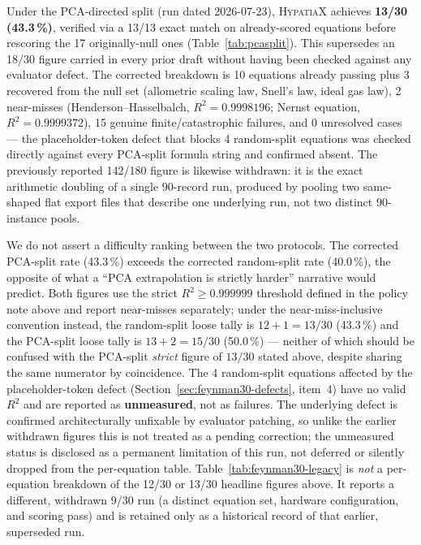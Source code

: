 \documentclass[twoside,11pt]{article}
\newcommand{\Rsq}{R^{2}}
\begin{document}
Under the PCA-directed split (run dated 2026-07-23), \textsc{HypatiaX}
achieves \textbf{13/30 (43.3\,\%)}, verified via a 13/13 exact match on
already-scored equations before rescoring the 17 originally-null ones
(Table~\ref{tab:pcasplit}). This supersedes an 18/30 figure carried in
every prior draft without having been checked against any evaluator
defect. The corrected breakdown is 10 equations already passing plus 3
recovered from the null set (allometric scaling law, Snell's law, ideal
gas law), 2 near-misses (Henderson--Hasselbalch, $\Rsq = 0.9998196$; Nernst
equation, $\Rsq = 0.9999372$), 15 genuine finite/catastrophic failures, and
0 unresolved cases --- the placeholder-token defect that blocks 4
random-split equations was checked directly against every PCA-split
formula string and confirmed absent. The previously reported 142/180
figure is likewise withdrawn: it is the exact arithmetic doubling of a
single 90-record run, produced by pooling two same-shaped flat export
files that describe one underlying run, not two distinct 90-instance
pools.

We do not assert a difficulty ranking between the two protocols. The
corrected PCA-split rate (43.3\,\%) exceeds the corrected random-split rate
(40.0\,\%), the opposite of what a ``PCA extrapolation is strictly harder''
narrative would predict. Both figures use the strict $\Rsq \geq 0.999999$
threshold defined in the policy note above and report near-misses
separately; under the near-miss-inclusive convention instead, the
random-split loose tally is $12+1=13/30$ (43.3\,\%) and the PCA-split loose
tally is $13+2=15/30$ (50.0\,\%) --- neither of which should be confused
with the PCA-split \emph{strict} figure of $13/30$ stated above, despite
sharing the same numerator by coincidence. The 4 random-split equations
affected by the placeholder-token defect (Section~\ref{sec:feynman30-defects},
item~4) have no valid $\Rsq$ and are reported as \textbf{unmeasured}, not as
failures. The underlying defect is confirmed architecturally unfixable by
evaluator patching, so unlike the earlier withdrawn figures this is not
treated as a pending correction; the unmeasured status is disclosed as a
permanent limitation of this run, not deferred or silently dropped from the
per-equation table. Table~\ref{tab:feynman30-legacy} is \emph{not} a per-equation
breakdown of the 12/30 or 13/30 headline figures above. It reports a
different, withdrawn 9/30 run (a distinct equation set, hardware
configuration, and scoring pass) and is retained only as a historical
record of that earlier, superseded run.
\end{document}
